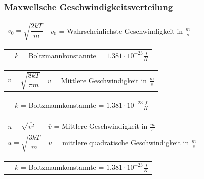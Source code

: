 		\subsubsection{Maxwellsche Geschwindigkeitsverteilung}
		\begin{minipage}[t]{13cm}
			\newline
			\renewcommand{\arraystretch}{2.5}
			\begin{tabular}{ p{3cm} | p{9cm}}
				$v_0 = \sqrt{\dfrac{2kT}{m}}$	&	$v_0$ = Wahrscheinlichste Geschwindigkeit in $\frac{m}{s}$\\
			\end{tabular}
			\renewcommand{\arraystretch}{1.5}
			\begin{tabular}{ p{3cm} | p{9cm} }
				& $k$ = Boltzmannkonstannte =  $1.381 \cdot 10^{-23} \frac{J}{K}$\\
			\end{tabular} 
			\renewcommand{\arraystretch}{1}
		\end{minipage}
		\newline
		\newline
		\newline
		\begin{minipage}[t]{13cm}
			\newline
			\renewcommand{\arraystretch}{2.5}
			\begin{tabular}{ p{3cm} | p{9cm}}
				$\overline{v} = \sqrt{\dfrac{8kT}{\pi m}}$	&	$\overline{v}$ = Mittlere Geschwindigkeit in $\frac{m}{s}$\\
			\end{tabular}
			\renewcommand{\arraystretch}{1.5}
			\begin{tabular}{ p{3cm} | p{9cm} }
				& $k$ = Boltzmannkonstannte =  $1.381 \cdot 10^{-23} \frac{J}{K}$\\
			\end{tabular} 
			\renewcommand{\arraystretch}{1}
		\end{minipage}
		\newline
		\newline
		\newline
		\begin{minipage}[t]{13cm}
			\newline
			\renewcommand{\arraystretch}{2.5}
			\begin{tabular}{ p{3cm} | p{9cm}}
				$u = \sqrt{\overline{v^2}}$ & $\overline{v}$ = Mittlere Geschwindigkeit in $\frac{m}{s}$\\
				$u = \sqrt{\dfrac{3kT}{m}}$	&	$u$ = mittlere quadratische Geschwindigkeit in $\frac{m}{s}$\\
			\end{tabular}
			\renewcommand{\arraystretch}{1.5}
			\begin{tabular}{ p{3cm} | p{9cm} }
				& $k$ = Boltzmannkonstannte =  $1.381 \cdot 10^{-23} \frac{J}{K}$\\
			\end{tabular} 
			\renewcommand{\arraystretch}{1}
		\end{minipage}
		\newline
		\newline
		\newline
